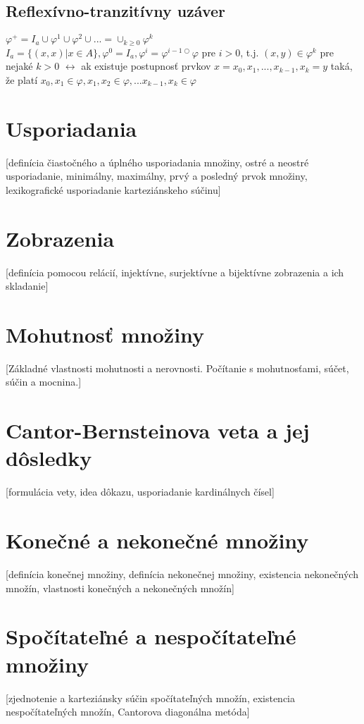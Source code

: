	\subsection {Reflexívno-tranzitívny uzáver}
		$\varphi^{+} = I_{a} \cup \varphi^{1} \cup \varphi^{2} \cup ... = \cup_{k \geq 0} \varphi^k$ \\
		
		$I_{a} = \{ ( x, x ) | x \in A \}, \varphi^{0} = I_{a}, \varphi^{i} = \varphi^{i-1 \bigcirc}\varphi$ pre $i> 0$, t.j. $(x, y) \in \varphi^{k}$ pre nejaké $k>0$ $\leftrightarrow $ ak existuje postupnosť prvkov $x = x_{0}, x_{1}, ..., x_{k-1}, x_{k} = y$ taká, že platí ${x_{0}, x_{1}} \in \varphi,  {x_{1}, x_{2}} \in \varphi, ... {x_{k-1}, x_{k}} \in \varphi$


\section{Usporiadania}
  [definícia čiastočného a úplného usporiadania množiny, ostré a neostré usporiadanie, minimálny, maximálny, prvý a posledný prvok množiny, lexikografické usporiadanie karteziánskeho súčinu] 

\section{Zobrazenia}
	[definícia pomocou relácií, injektívne, surjektívne a bijektívne zobrazenia a ich skladanie] 

\section {Mohutnosť množiny}
  [Základné vlastnosti mohutnosti a nerovnosti. Počítanie s mohutnosťami, súčet, súčin a mocnina.] 

\section {Cantor-Bernsteinova veta a jej dôsledky}
  [formulácia vety, idea dôkazu, usporiadanie kardinálnych čísel] 

\section {Konečné a nekonečné množiny}
  [definícia konečnej množiny, definícia nekonečnej množiny, existencia nekonečných množín, vlastnosti konečných a nekonečných množín]

\section {Spočítateľné a nespočítateľné množiny}
  [zjednotenie a karteziánsky súčin spočítateľných množín, existencia nespočítateľných množín, Cantorova diagonálna metóda]

